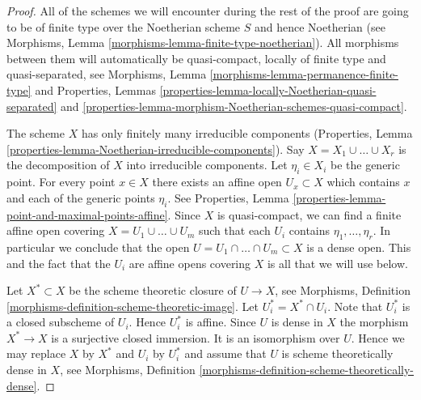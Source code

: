 \begin{proof}
All of the schemes we will encounter during the rest of the proof
are going to be of finite type over the Noetherian scheme $S$ and
hence Noetherian
(see Morphisms, Lemma \ref{morphisms-lemma-finite-type-noetherian}).
All morphisms between them will automatically be quasi-compact, locally of
finite type and quasi-separated, see
Morphisms, Lemma \ref{morphisms-lemma-permanence-finite-type} and
Properties,
Lemmas \ref{properties-lemma-locally-Noetherian-quasi-separated} and
\ref{properties-lemma-morphism-Noetherian-schemes-quasi-compact}.

\medskip\noindent
The scheme $X$ has only finitely many irreducible components
(Properties, Lemma \ref{properties-lemma-Noetherian-irreducible-components}).
Say $X = X_1 \cup \ldots \cup X_r$ is the decomposition
of $X$ into irreducible components.
Let $\eta_i \in X_i$ be the generic point.
For every point $x \in X$ there exists an affine open
$U_x \subset X$ which contains $x$ and each of the generic
points $\eta_i$. See
Properties, Lemma \ref{properties-lemma-point-and-maximal-points-affine}.
Since $X$ is quasi-compact, we can find a finite affine open
covering $X = U_1 \cup \ldots \cup U_m$ such that
each $U_i$ contains $\eta_1, \ldots, \eta_r$.
In particular we conclude that the open
$U = U_1 \cap \ldots \cap U_m \subset X$ is
a dense open. This and the fact that the $U_i$ are affine opens
covering $X$ is all that we will use below.

\medskip\noindent
Let $X^* \subset X$ be the scheme theoretic closure of $U \to X$, see
Morphisms, Definition \ref{morphisms-definition-scheme-theoretic-image}.
Let $U_i^* = X^* \cap U_i$. Note that $U_i^*$ is a closed subscheme
of $U_i$. Hence $U_i^*$ is affine. Since $U$ is dense in $X$ the
morphism $X^* \to X$ is a surjective closed immersion. It is an
isomorphism over $U$. Hence we may replace $X$ by $X^*$ and
$U_i$ by $U_i^*$ and assume that $U$ is scheme theoretically dense
in $X$, see
Morphisms, Definition \ref{morphisms-definition-scheme-theoretically-dense}.


\end{proof}
